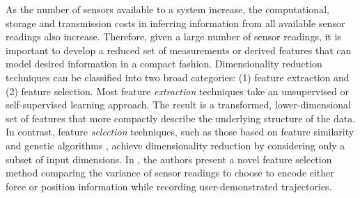 As the number of sensors available to a system increase, the computational, storage and transmission costs in inferring information from all available sensor readings also increase.
Therefore, given a large number of sensor readings, it is important to develop a reduced set of measurements or derived features that can model desired information in a compact fashion.  
Dimensionality reduction techniques can be classified into two broad categories: (1) feature extraction and (2) feature selection.  Most feature \emph{extraction} techniques take an unsupervised \cite{ghahramani1996algorithm,saul2003think,tenenbaum2000global,hein2010unsupervised} or self-supervised \cite{angelova2007dimensionality,dahlkamp2006self,lieb2005adaptive,sofman2006improving} learning approach.  
The result is a transformed, lower-dimensional set of features that more compactly describe the underlying structure of the data.  
In contrast, feature \emph{selection} techniques, such as those based on feature similarity \cite{mitra2002unsupervised} and genetic algorithms \cite{huang2006ga}, achieve dimensionality reduction by considering only a subset of input dimensions. 
In \cite{pais2013learning}, the authors present a novel feature selection method comparing the variance of sensor readings to choose to encode either force or position information while recording user-demonstrated trajectories.




